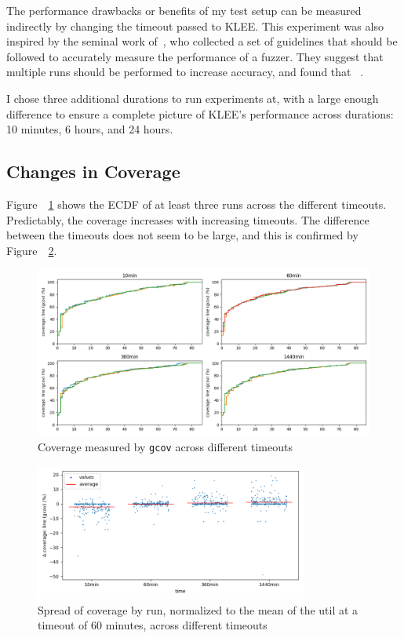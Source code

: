 \documentclass{article}
\let\savedCite=\cite
\renewcommand{\cite}{\unskip~\savedCite}
\let\savedRef=\ref
\renewcommand{\ref}{\unskip~\savedRef}
\begin{document}
The performance drawbacks or benefits of my test setup can be measured indirectly by changing the timeout passed to KLEE. This experiment was also inspired by the seminal work of~\citeauthor{EvaluatingFuzzTesting}, who collected a set of guidelines that should be followed to accurately measure the performance of a fuzzer. They suggest that multiple runs should be performed to increase accuracy, and found that \cite{EvaluatingFuzzTesting}.

I chose three additional durations to run experiments at, with a large enough difference to ensure a complete picture of KLEE's performance across durations: 10 minutes, 6 hours, and 24 hours.

\subsection{Changes in Coverage}

Figure~\ref{fig:ecdf_across_times} shows the ECDF of at least three runs across the different timeouts. Predictably, the coverage increases with increasing timeouts. The difference between the timeouts does not seem to be large, and this is confirmed by Figure~\ref{fig:spread_across_times_gcov}.

\begin{figure}[htbp]
    \centering
    \includegraphics[width=1\textwidth]{../plots/gcov_cov/ecdf_by_time.png}
    \caption{Coverage measured by \lstinline{gcov} across different timeouts}
    \label{fig:ecdf_across_times}
\end{figure}

\begin{figure}[htbp]
    \centering
    \includegraphics[width=0.8\textwidth]{../plots/gcov_cov/changes-by-time.png}
    \captionsetup{width=0.6\textwidth}
    \caption{Spread of coverage by run, normalized to the mean of the util at a timeout of 60 minutes, across different timeouts}
    \label{fig:spread_across_times_gcov}
\end{figure}
\end{document}
